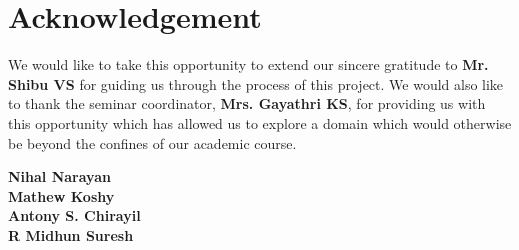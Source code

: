 \chapter*{\centering Acknowledgement}

\begin{flushleft}
	 We would like to take this opportunity to extend our sincere gratitude to \textbf{Mr. Shibu VS} for guiding us through the process of this project.
	 We would also like to thank the seminar coordinator, \textbf{Mrs. Gayathri KS}, for providing us with this opportunity which has allowed us to explore a domain which would otherwise be beyond the confines of our academic course.
\end{flushleft}

\vspace{4.0 cm}

\begin{flushright}
	\textbf{Nihal Narayan} \\
	\textbf{Mathew Koshy} \\
	\textbf{Antony S. Chirayil} \\
	\textbf{R Midhun Suresh} \\
\end{flushright}














